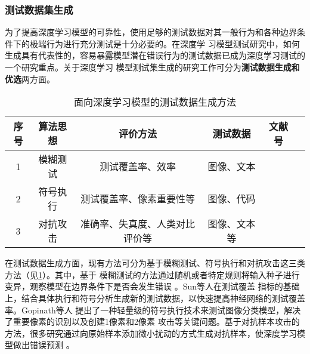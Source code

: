 


\subsubsection{测试数据集生成}

为了提高深度学习模型的可靠性，使用足够的测试数据对其一般行为和各种边界条件下的极端行为进行充分测试是十分必要的。在深度学
习模型测试研究中，如何生成具有代表性的，容易暴露模型潜在错误行为的测试数据已成为深度学习测试的一个研究重点。关于深度学习
模型测试集生成的研究工作可分为\textbf{测试数据生成和优选}两方面。


\begin{table}[htp]
	\renewcommand\arraystretch{1.5}
	\small
	\centering
	\caption{面向深度学习模型的测试数据生成方法}
	\label{tab:testingDataGen}
	\begin{tabular}{cccccc}
		\toprule
		\textbf{序号} & \textbf{算法思想} & \textbf{评价方法}              & \textbf{测试数据} & \textbf{文献号}                                                             \\
		\midrule
		1             & 模糊测试          & 测试覆盖率、效率               & 图像、文本        & \cite{Odena2019TensorFuzz}\cite{Guo2018DLFuzz}\cite{xie2019coverage}        \\
		2             & 符号执行          & 测试覆盖率、像素重要性等       & 图像、代码        & \cite{Gopinath2018Symbolic}\cite{Sun2018Concolic}                           \\
		3             & 对抗攻击          & 准确率、失真度、人类对比评价等 & 图像、文本等      & \cite{Xiao2018Spatially}\cite{Wicker2018FeatureGuided}\cite{He2018Decision} \\
		\bottomrule
	\end{tabular}
\end{table}


在测试数据生成方面，现有方法可分为基于模糊测试、符号执行和对抗攻击这三类方法（见\cref{tab:testingDataGen}）。其中，基于
模糊测试的方法通过随机或者特定规则将输入种子进行变异，观察模型在边界条件下是否会发生错误
。Sun等人在测试覆盖
指标的基础上，结合具体执行和符号分析生成新的测试数据，以快速提高神经网络的测试覆盖率。Gopinath等人
提出了一种轻量级的符号执行技术来测试图像分类模型，解决了重要像素的识别以及创建1像素和2像素
攻击等关键问题。基于对抗样本攻击的方法，很多研究通过向原始样本添加微小扰动的方式生成对抗样本，使深度学习模型做出错误预测
。

